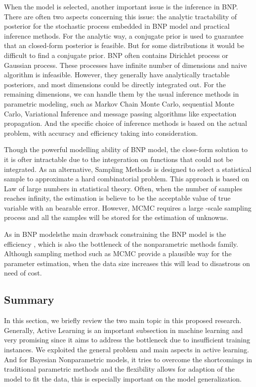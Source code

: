 When the model is selected, another important issue is the inference in BNP. There are often two aspects concerning this issue: the analytic tractability of posterior for the stochastic process embedded in BNP model and practical inference methods\cite{walker1999bayesian,muller2004nonparametric}. For the analytic way, a conjugate prior is used to guarantee that an closed-form posterior is feasible. But for some distributions it would be difficult to find a conjugate prior. BNP often contains Dirichlet process or Gaussian process. These processes have infinite number of dimensions and naive algorithm is infeasible. However, they generally have analytically tractable posteriors, and most dimensions could be directly integrated out. For the remaining dimensions, we can handle them by the usual inference methods in parametric modeling, such as Markov Chain Monte Carlo, sequential Monte Carlo, Variational Inference and message passing algorithms like expectation propagation\cite{hjort2010bayesian,muller2004nonparametric}. And the specific choice of inference methods is based on the actual problem, with accuracy and efficiency taking into consideration. 

Though the powerful modelling ability of BNP model, the close-form solution to it is ofter intractable due to the integeration on functions that could not be integrated. As an alternative, Sampling Methods is designed to select a statistical sample to approximate a hard combinatorial problem. This approach is based on Law of large numbers in statistical theory\cite{ASB:8937274}. Often, when the number of samples reaches infinity, the estimation is believe to be the acceptable value of true variable with an bearable error. However, MCMC requires a large -scale sampling process and all the samples will be stored for the estimation of unknowns. 

As in BNP modelsthe main drawback constraining the BNP model is the efficiency , which is also the bottleneck of the nonparametric methods family\cite{hollander2013nonparametric}. Although sampling method such as MCMC provide a plausible way for the parameter estimation, when the data size increases this will lead to disastrous on need of cost\cite{ghosh1982nonparametric}.
\subsection{Summary}

In this section, we briefly review the two main topic in this proposed research. Generally, Active Learning is an important subsection in machine learning and very promising since it aims to address the bottleneck due to insufficient training instances. We exploited the general problem and main aspects in active learning. And for Bayesian Nonparametric models, it tries to overcome the shortcomings in traditional parametric methods and the flexibility allows for adaption of the model to fit the data,  this is especially important on the model generalization. 

